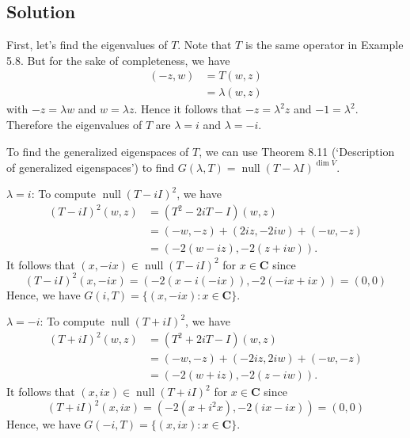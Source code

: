 \documentclass{article}
\begin{document}
\subsection*{Solution}
First, let's find the eigenvalues of $T$. Note that $T$ is the same operator in Example 5.8. But for the sake of completeness, we have
\begin{align*}
    (-z,w)&=T(w,z)\\
    &=\lambda (w,z)
\end{align*}
with $-z=\lambda w$ and $w=\lambda z$. Hence it follows that $-z=\lambda^2z$ and $-1=\lambda^2$. Therefore the eigenvalues of $T$ are $\lambda=i$ and $\lambda=-i$.

To find the generalized eigenspaces of $T$, we can use Theorem 8.11 (`Description of generalized eigenspaces') to find $G(\lambda,T)=\operatorname{null}(T-\lambda I)^{\operatorname{dim}V}$.

$\lambda=i$: To compute $\operatorname{null}(T-i I)^{2}$, we have
\begin{align*}
    (T-i I)^{2}(w,z)&=(T^2-2iT-I)(w,z)\\
    &=(-w,-z)+(2iz,-2iw)+(-w,-z)\\
    &=(-2(w-iz),-2(z+iw)).
\end{align*}
It follows that $(x,-ix)\in\operatorname{null}(T-i I)^{2}$ for $x\in\mathbf{C}$ since 
\[(T-i I)^{2}(x,-ix)=(-2(x-i(-ix)),-2(-ix+ix))=(0,0)\]
Hence, we have $G(i,T)=\{(x,-ix):x\in\mathbf{C}\}$.

$\lambda=-i$: To compute $\operatorname{null}(T+i I)^{2}$, we have
\begin{align*}
    (T+i I)^{2}(w,z)&=(T^2+2iT-I)(w,z)\\
    &=(-w,-z)+(-2iz,2iw)+(-w,-z)\\
    &=(-2(w+iz),-2(z-iw)).
\end{align*}
It follows that $(x,ix)\in\operatorname{null}(T+i I)^{2}$ for $x\in\mathbf{C}$ since 
\[(T+i I)^{2}(x,ix)=(-2(x+i^2x),-2(ix-ix))=(0,0)\]
Hence, we have $G(-i,T)=\{(x,ix):x\in\mathbf{C}\}$.
\end{document}
